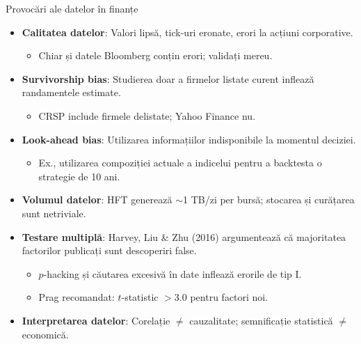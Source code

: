 \documentclass[9pt, aspectratio=169, t]{beamer}
\theoremstyle{definition}
\begin{document}
\begin{frame}{Provocări ale datelor în finanțe}
\begin{itemize}
    \item \textbf{Calitatea datelor}: Valori lipsă, tick-uri eronate, erori la acțiuni corporative.
    \begin{itemize}
        \item Chiar și datele Bloomberg conțin erori; validați mereu.
    \end{itemize}
    \item \textbf{Survivorship bias}: Studierea doar a firmelor listate curent inflează randamentele estimate.
    \begin{itemize}
        \item CRSP include firmele delistate; Yahoo Finance nu.
    \end{itemize}
    \item \textbf{Look-ahead bias}: Utilizarea informațiilor indisponibile la momentul deciziei.
    \begin{itemize}
        \item Ex., utilizarea compoziției actuale a indicelui pentru a backtesta o strategie de 10 ani.
    \end{itemize}
    \item \textbf{Volumul datelor}: HFT generează $\sim$1 TB/zi per bursă; stocarea și curățarea sunt netriviale.
    \item \textbf{Testare multiplă}: Harvey, Liu \& Zhu (2016) argumentează că majoritatea factorilor publicați sunt descoperiri false.
    \begin{itemize}
        \item $p$-hacking și căutarea excesivă în date inflează erorile de tip I.
        \item Prag recomandat: $t$-statistic $> 3.0$ pentru factori noi.
    \end{itemize}
    \item \textbf{Interpretarea datelor}: Corelație $\neq$ cauzalitate; semnificație statistică $\neq$ economică.
\end{itemize}
\end{frame}
\end{document}
